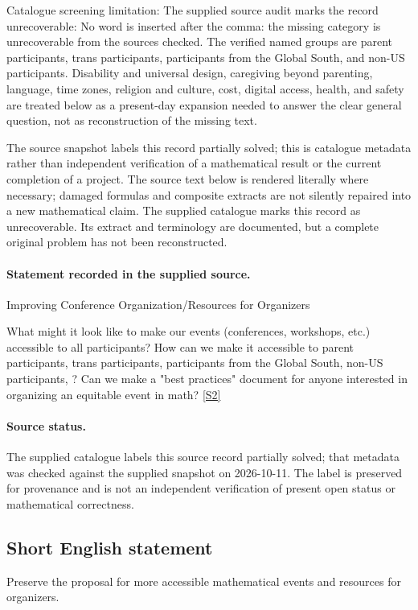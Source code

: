 \documentclass[11pt]{article}
\begin{document}
Catalogue screening limitation: The supplied source audit marks the record unrecoverable: No word is inserted after the comma: the missing category is unrecoverable from the sources checked. The verified named groups are parent participants, trans participants, participants from the Global South, and non-US participants. Disability and universal design, caregiving beyond parenting, language, time zones, religion and culture, cost, digital access, health, and safety are treated below as a present-day expansion needed to answer the clear general question, not as reconstruction of the missing text.

The source snapshot labels this record partially solved; this is catalogue metadata rather than independent verification of a mathematical result or the current completion of a project.
The source text below is rendered literally where necessary; damaged formulas and composite extracts are not silently repaired into a new mathematical claim.
The supplied catalogue marks this record as unrecoverable. Its extract and terminology are documented, but a complete original problem has not been reconstructed.
\paragraph{Statement recorded in the supplied source.}
Improving Conference Organization/Resources for Organizers

What might it look like to make our events (conferences, workshops, etc.) accessible to all participants? How can we make it accessible to parent participants, trans participants, participants from the Global South, non-US participants, ? Can we make a "best practices" document for anyone interested in organizing an equitable event in math? \href{http://aimpl.org/gemscombin/7/}{[S2]}
\paragraph{Source status.}
The supplied catalogue labels this source record partially solved; that metadata was checked against the supplied snapshot on 2026-10-11. The label is preserved for provenance and is not an independent verification of present open status or mathematical correctness.
\subsection{Short English statement}
Preserve the proposal for more accessible mathematical events and resources for organizers.
\end{document}
